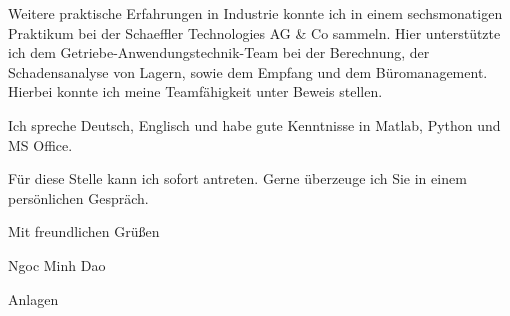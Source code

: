 \documentclass[11pt,a4paper]{letter}
\begin{document}
Weitere praktische Erfahrungen in Industrie konnte ich in einem sechsmonatigen Praktikum bei der Schaeffler Technologies AG \& Co sammeln.
Hier unterstützte ich dem Getriebe-Anwendungstechnik-Team bei der Berechnung, der Schadensanalyse von Lagern, sowie dem Empfang und dem Büromanagement.
Hierbei konnte ich meine Teamfähigkeit unter Beweis stellen.

Ich spreche Deutsch, Englisch und habe gute Kenntnisse in Matlab, Python und MS Office.

Für diese Stelle kann ich sofort antreten.
Gerne überzeuge ich Sie in einem persönlichen Gespräch.

\vspace{1em}

Mit freundlichen Grüßen

Ngoc Minh Dao

Anlagen
\end{document}
